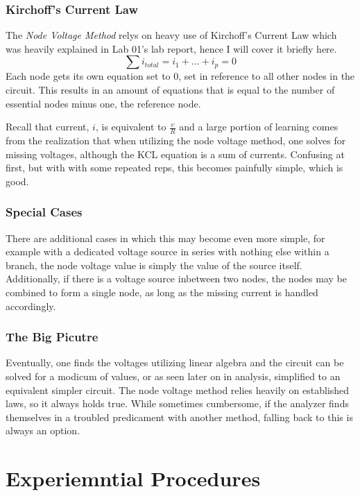 \documentclass[12pt]{article}
\begin{document}
\subsubsection{Kirchoff's Current Law}
The \textit{Node Voltage Method} relys on heavy use of Kirchoff's Current Law
which was heavily explained in Lab 01's lab report, hence I will cover it
briefly here.
\[
	\sum i_{total} = i_1 + ... + i_p = 0\]
Each node gets its own equation set to 0, set in reference to all other nodes in
the circuit. This results in an amount of equations that is equal to the number
of essential nodes minus one, the reference node.

Recall that current, $i$, is equivalent to
$\frac{\upsilon}{R}$ and a large portion of learning comes from the realization
that when utilizing the node voltage method, one solves for missing voltages,
although the KCL equation is a sum of currents. Confusing at first, but with
with some repeated reps, this becomes painfully simple, which is good.

\subsubsection{Special Cases}
There are additional cases in which this may become even more simple, for
example with a dedicated voltage source in series with nothing else within a
branch, the node voltage value is simply the value of the source itself.
Additionally, if there is a voltage source inbetween two nodes, the nodes may be
combined to form a single node, as long as the missing current is handled
accordingly.

\subsubsection{The Big Picutre}
Eventually, one finds the voltages utilizing linear algebra and the circuit can
be solved for a modicum of values, or as seen later on in analysis, simplified
to an equivalent simpler circuit. The node voltage method relies heavily on
established laws, so it always holds true. While sometimes cumbersome, if the
analyzer finds themselves in a troubled predicament with another method, falling
back to this is always an option.

\section{Experiemntial Procedures}
\end{document}

